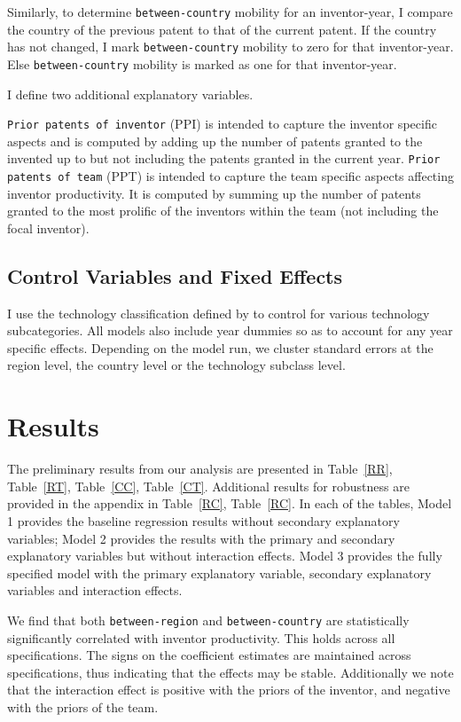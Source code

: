 \documentclass[12pt]{article}
\begin{document}
Similarly, to determine \texttt{between-country} mobility for an inventor-year,  I  compare the country  of the previous patent to that of the current patent. If the country has not changed, I mark \texttt{between-country} mobility to zero for that inventor-year. Else \texttt{between-country} mobility is marked as one for that inventor-year.\par

I define two additional explanatory variables. \par
\texttt{Prior patents of inventor} (PPI) is intended to capture the inventor specific aspects and is computed by adding up the number of patents granted to the invented up to but not including the patents granted in the current year. \texttt{Prior patents of team} (PPT) is intended to capture the team specific aspects affecting inventor productivity. It is computed by summing up the number of patents granted to the most prolific of the inventors within the team (not including the focal inventor).

\subsection{Control Variables and Fixed Effects}
I use the technology classification defined by  \cite{Hall2001} to control for various technology subcategories. All models also include  year dummies so as to account for any year specific effects. Depending on the model run, we cluster standard errors at the region level, the country level or the technology subclass level.
\newpage
\section{Results}
The preliminary results from our analysis are presented in Table~\ref{RR},  Table~\ref{RT}, Table~\ref{CC},  Table~\ref{CT}. Additional results for robustness are provided in the appendix in Table~\ref{RC},  Table~\ref{RC}. In each of the tables, Model 1 provides the baseline regression results without secondary explanatory variables; Model 2 provides the results with the primary and secondary explanatory variables but without interaction effects. Model 3 provides the fully specified model with the primary explanatory variable, secondary explanatory variables and interaction effects. \par

We find that both \texttt{between-region} and \texttt{between-country} are statistically significantly correlated with inventor productivity. This holds across all specifications. The  signs on the coefficient estimates are maintained across specifications, thus indicating that the effects may be stable. Additionally we note that the interaction effect is positive with the priors of the inventor, and negative with the priors of the team.
\end{document}
